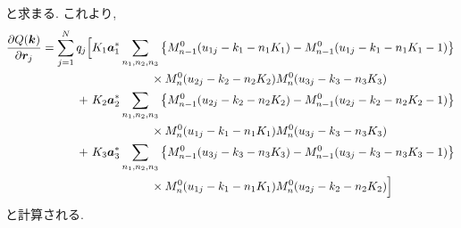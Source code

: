 と求まる. これより,
\begin{align}
  \frac{\partial Q(\bm{k})}{\partial \bm{r}_{j}}
 =
    \sum_{j=1}^{N} q_{j}
    \Bigl[
           &K_{1} \bm{a}_{1}^{*}
            \sum_{n_{1},n_{2},n_{3}}
            \left\{
              M_{n-1}^{0}(u_{1j} - k_{1} - n_{1}K_{1}) - M_{n-1}^{0}(u_{1j} - k_{1} - n_{1}K_{1} - 1)
            \right\}
            \notag \\
            &~~~~~~~~~~~~~~~\times
            M_{n}^{0}(u_{2j} - k_{2} - n_{2}K_{2}) M_{n}^{0}(u_{3j} - k_{3} - n_{3}K_{3})
    \notag \\
          +~&K_{2} \bm{a}_{2}^{*}
            \sum_{n_{1},n_{2},n_{3}}
            \left\{
              M_{n-1}^{0}(u_{2j} - k_{2} - n_{2}K_{2}) - M_{n-1}^{0}(u_{2j} - k_{2} - n_{2}K_{2} - 1)
            \right\}
            \notag \\
            &~~~~~~~~~~~~~~~\times
            M_{n}^{0}(u_{1j} - k_{1} - n_{1}K_{1}) M_{n}^{0}(u_{3j} - k_{3} - n_{3}K_{3})
    \notag \\
          +~&K_{3} \bm{a}_{3}^{*}
            \sum_{n_{1},n_{2},n_{3}}
            \left\{
              M_{n-1}^{0}(u_{3j} - k_{3} - n_{3}K_{3}) - M_{n-1}^{0}(u_{3j} - k_{3} - n_{3}K_{3} - 1)
            \right\}
            \notag \\
            &~~~~~~~~~~~~~~~\times
            M_{n}^{0}(u_{1j} - k_{1} - n_{1}K_{1}) M_{n}^{0}(u_{2j} - k_{2} - n_{2}K_{2})
    \Bigr]
 \label{eq:PME27}
\end{align}
と計算される.
\\


